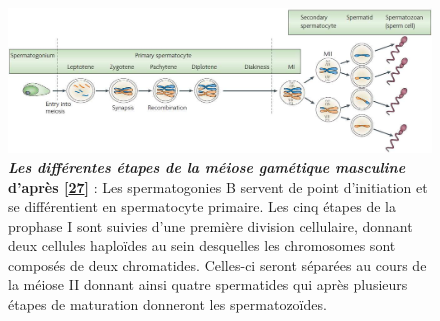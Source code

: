 \documentclass[12pt,a4paper,twoside]{ugathesis}
\theoremstyle{definition}
\theoremstyle{definition}
\theoremstyle{definition}
\theoremstyle{remark}
\begin{document}
\begin{figure}

{\centering \includegraphics[scale=0.33]{figure/Meiosis_Stages} 

}

\caption[Les différentes étapes de la méiose gamétique masculine]{\textbf{\emph{Les différentes étapes de la méiose
gamétique masculine} d'après
{[}\protect\hyperlink{ref-Sasaki2008}{27}{]}} : Les spermatogonies B
servent de point d'initiation et se différentient en spermatocyte
primaire. Les cinq étapes de la prophase I sont suivies d'une première
division cellulaire, donnant deux cellules haploïdes au sein desquelles
les chromosomes sont composés de deux chromatides. Celles-ci seront
séparées au cours de la méiose II donnant ainsi quatre spermatides qui
après plusieurs étapes de maturation donneront les spermatozoïdes.}\label{fig:pictmeiose}
\end{figure}











\newpage
\end{document}
